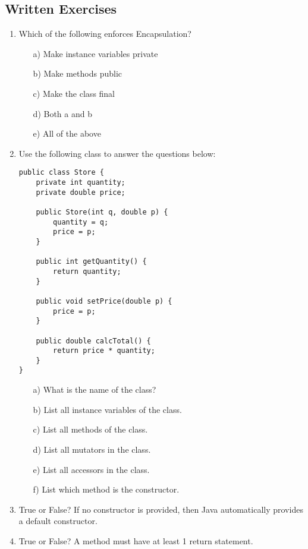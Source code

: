 \subsection{Written Exercises}

\begin{enumerate}

\item Which of the following enforces Encapsulation?
\begin{enumerate}
\item[a)]Make instance variables private
\item[b)]Make methods public
\item[c)]Make the class final
\item[d)]Both a and b
\item[e)]All of the above
\end{enumerate}

\item Use the following class to answer the questions below:
\label{question:store}
\begin{lstlisting}
public class Store {
	private int quantity;
	private double price;

	public Store(int q, double p) {
		quantity = q;
		price = p;
	}

	public int getQuantity() {
		return quantity;
	}

	public void setPrice(double p) {
		price = p;
	}

	public double calcTotal() {
		return price * quantity;
	}
}
\end{lstlisting}
\begin{enumerate}
\item[a)]What is the name of the class?
\item[b)]List all instance variables of the class.
\item[c)]List all methods of the class.
\item[d)]List all mutators in the class.
\item[e)]List all accessors in the class.
\item[f)]List which method is the constructor.
\end{enumerate}

\item True or False? If no constructor is provided, then Java automatically provides a default constructor.

\item True or False? A method must have at least 1 return statement.

\end{enumerate}

